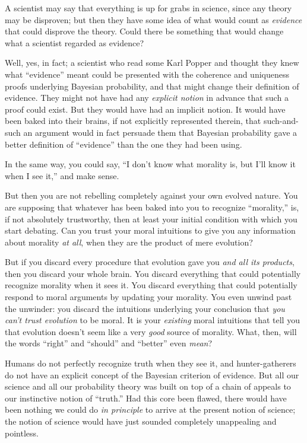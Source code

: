 {
 A scientist may say that everything is up for grabs in science,
since any theory may be disproven; but then they have some idea of what
would count as \textit{evidence} that could disprove the theory. Could
there be something that would change what a scientist regarded as
evidence?}

{
 Well, yes, in fact; a scientist who read some Karl Popper and
thought they knew what ``evidence''
meant could be presented with the coherence and uniqueness proofs
underlying Bayesian probability, and that might change their definition
of evidence. They might not have had any \textit{explicit notion} in
advance that such a proof could exist. But they would have had an
implicit notion. It would have been baked into their brains, if not
explicitly represented therein, that such-and-such an argument would in
fact persuade them that Bayesian probability gave a better definition
of ``evidence'' than the one they
had been using.}

{
 In the same way, you could say, ``I
don't know what morality is, but I'll
know it when I see it,'' and make sense.}

{
 But then you are not rebelling completely against your own evolved
nature. You are supposing that whatever has been baked into you to
recognize ``morality,'' is, if not
absolutely trustworthy, then at least your initial condition with which
you start debating. Can you trust your moral intuitions to give you any
information about morality \textit{at all}, when they are the product
of mere evolution?}

{
 But if you discard every procedure that evolution gave you
\textit{and all its products}, then you discard your whole brain. You
discard everything that could potentially recognize morality when it
sees it. You discard everything that could potentially respond to moral
arguments by updating your morality. You even unwind past the unwinder:
you discard the intuitions underlying your conclusion that \textit{you
can't trust evolution} to be moral. It is your
\textit{existing} moral intuitions that tell you that evolution
doesn't seem like a very \textit{good} source of
morality. What, then, will the words
``right'' and
``should'' and
``better'' even \textit{mean}?}

{
 Humans do not perfectly recognize truth when they see it, and
hunter-gatherers do not have an explicit concept of the Bayesian
criterion of evidence. But all our science and all our probability
theory was built on top of a chain of appeals to our instinctive notion
of ``truth.'' Had this core been
flawed, there would have been nothing we could do \textit{in principle}
to arrive at the present notion of science; the notion of science would
have just sounded completely unappealing and pointless.}

